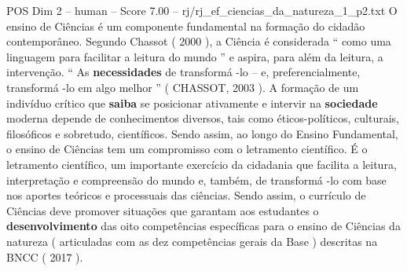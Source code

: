 \begin{textsample}{POS Dim 2 – human – Score 7.00 – rj/rj\_ef\_ciencias\_da\_natureza\_1\_p2.txt}  \label{ex:f2_pos_005}
O ensino de Ciências é um componente fundamental na formação do cidadão contemporâneo.
Segundo Chassot ( 2000 ), a Ciência é considerada “ como uma linguagem para facilitar a leitura do mundo ” e aspira, para além da leitura, a intervenção. “ As \textbf{necessidades} de transformá -lo – e, preferencialmente, transformá -lo em algo melhor ” ( CHASSOT, 2003 ).
A formação de um indivíduo crítico que \textbf{saiba} se posicionar ativamente e intervir na \textbf{sociedade} moderna depende de conhecimentos diversos, tais como éticos-políticos, culturais, filosóficos e sobretudo, científicos.
Sendo assim, ao longo do Ensino Fundamental, o ensino de Ciências tem um compromisso com o letramento científico. É o letramento científico, um importante exercício da cidadania que facilita a leitura, interpretação e compreensão do mundo e, também, de transformá -lo com base nos aportes teóricos e processuais das ciências.
Sendo assim, o currículo de Ciências deve promover situações que garantam aos estudantes o \textbf{desenvolvimento} das oito competências específicas para o ensino de Ciências da natureza ( articuladas com as dez competências gerais da Base ) descritas na BNCC ( 2017 ).

\end{textsample}
